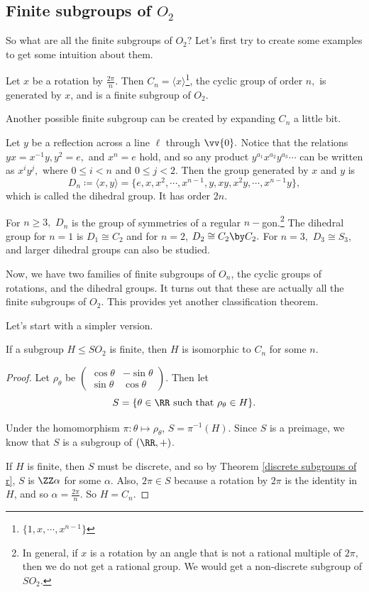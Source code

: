 \subsection{Finite subgroups of \texorpdfstring{$O_2$}{O2}}
So what are all the finite subgroups of $O_2?$ 
Let's first try to create some examples to get some intuition about them.
\begin{example}
Let $x$ be a rotation by $\frac{2\pi}{n}.$ Then $C_n = \langle x \rangle$\footnote{$\{1, x, \cdots, x^{n-1}\}$}, the cyclic group of order $n,$ is generated by $x$, and is a finite subgroup of $O_2.$ 
\end{example}

Another possible finite subgroup can be created by expanding $C_n$ a little bit. 
\begin{example}
Let $y$ be a reflection across a line $\ell$ through $\vv{0}.$ Notice that the relations $yx = x^{-1}y, y^2 = e,$ and $x^n = e$ hold, and so any product  $y^{a_1}x^{a_2}y^{a_3}\cdots$ can be written as $x^{i}y^{j},$ where $0 \leq i < n$ and $0 \leq j < 2.$ Then the group generated by $x$ and $y$ is 
\[
D_n \coloneqq \langle x, y \rangle = \{e, x, x^2, \cdots, x^{n-1}, y, xy, x^2y, \cdots, x^{n-1}y\},
\]
which is called the dihedral group. It has order $2n.$
\end{example}

For $n \geq 3,$ $D_n$ is the group of symmetries of a regular $n-$gon.\footnote{In general, if $x$ is a rotation by an angle that is not a rational multiple of $2\pi,$ then we do not get a rational group. We would get a non-discrete subgroup of $SO_2.$} The dihedral group for $n= 1$ is $D_1 \cong C_2$ and for $n = 2$, $D_2 \cong C_2 \by C_2.$ For $n=3,$ $D_3 \cong S_3,$ and larger dihedral groups can also be studied. 

Now, we have two families of finite subgroups of $O_n$, the cyclic groups of rotations, and the dihedral groups. It turns out that these are actually all the finite subgroups of $O_2$. This provides yet another classification theorem.

Let's start with a simpler version. 
\begin{theorem}
If a subgroup $H \leq SO_2$ is finite, then $H$ is isomorphic to $C_n$ for some $n.$
\end{theorem}
\begin{proof}
Let $\rho_{\theta}$ be $\begin{pmatrix}
\cos\theta & -\sin\theta \\
\sin\theta & \cos\theta
\end{pmatrix}$. Then let
\[
S = \{\theta \in \RR \text{ such that } \rho_{\theta} \in H\}.
\]

Under the homomorphism $\pi: \theta \mapsto \rho_{\theta}$, $S = \pi^{-1}(H).$ Since $S$ is a preimage, we know that $S$ is a subgroup of $(\RR, +)$.

If $H$ is finite, then $S$ must be discrete, and so by Theorem \ref{discrete subgroups of r}, $S$ is $\ZZ \alpha$ for some $\alpha.$ Also, $2\pi \in S$ because a rotation by $2\pi$ is the identity in $H$, and so $\alpha = \frac{2\pi}{n}$. So $\boxed{H= C_n.}$ 
\end{proof}

